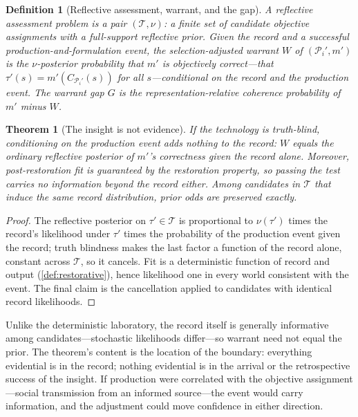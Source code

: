 \documentclass[11pt]{article}
\newtheorem{definition}[assumption]{Definition}
\newtheorem{theorem}[assumption]{Theorem}
\begin{document}
\begin{definition}[Reflective assessment, warrant, and the gap]
\label{def:warrant}
A reflective assessment problem is a pair $(\mathcal T,\nu)$: a finite set of
candidate objective assignments with a full-support reflective prior.  Given
the record and a successful production-and-formulation event, the
\emph{selection-adjusted warrant} $W$ of $(\mathcal P_i',m')$ is the
$\nu$-posterior probability that $m'$ is objectively correct---that
$\tau'(s)=m'(C_{\mathcal P_i'}(s))$ for all $s$---conditional on the record
\emph{and} the production event.  The \emph{warrant gap} $G$ is the
representation-relative coherence probability of $m'$ minus $W$.
\end{definition}

\begin{theorem}[The insight is not evidence]
\label{thm:uninformative-production}
If the technology is truth-blind, conditioning on the production event adds
nothing to the record: $W$ equals the ordinary reflective posterior of $m'$'s
correctness given the record alone.  Moreover, post-restoration fit is
guaranteed by the restoration property, so passing the test carries no
information beyond the record either.  Among candidates in $\mathcal T$ that
induce the same record distribution, prior odds are preserved exactly.
\end{theorem}

\begin{proof}
The reflective posterior on $\tau'\in\mathcal T$ is proportional to
$\nu(\tau')$ times the record's likelihood under $\tau'$ times the probability
of the production event given the record; truth blindness makes the last
factor a function of the record alone, constant across $\mathcal T$, so it
cancels.  Fit is a deterministic function of record and output
(\cref{def:restorative}), hence likelihood one in every world consistent with
the event.  The final claim is the cancellation applied to candidates with
identical record likelihoods.
\end{proof}

Unlike the deterministic laboratory, the record itself is generally
informative among candidates---stochastic likelihoods differ---so warrant need
not equal the prior.  The theorem's content is the location of the boundary:
everything evidential is in the record; nothing evidential is in the arrival
or the retrospective success of the insight.  If production were correlated
with the objective assignment---social transmission from an informed
source---the event would carry information, and the adjustment could move
confidence in either direction.
\end{document}
